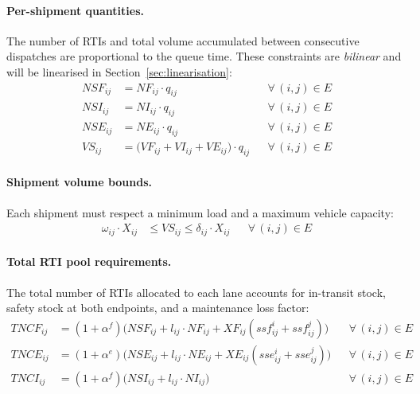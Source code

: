 \paragraph{Per-shipment quantities.}
The number of RTIs and total volume accumulated between consecutive dispatches
are proportional to the queue time. These constraints are \emph{bilinear} and
will be linearised in Section~\ref{sec:linearisation}:
%
\begin{align}
  NSF_{ij} &= NF_{ij}\cdot q_{ij}
    && \forall\,(i,j)\in E
    \label{eq:ship-full}\\
  NSI_{ij} &= NI_{ij}\cdot q_{ij}
    && \forall\,(i,j)\in E
    \label{eq:ship-inlay}\\
  NSE_{ij} &= NE_{ij}\cdot q_{ij}
    && \forall\,(i,j)\in E
    \label{eq:ship-empty}\\
  VS_{ij}  &= \bigl(VF_{ij}+VI_{ij}+VE_{ij}\bigr)\cdot q_{ij}
    && \forall\,(i,j)\in E
    \label{eq:ship-vol}
\end{align}

\paragraph{Shipment volume bounds.}
Each shipment must respect a minimum load and a maximum vehicle capacity:
%
\begin{align}
  \omega_{ij}\cdot X_{ij} &\leq VS_{ij} \leq \delta_{ij}\cdot X_{ij}
    && \forall\,(i,j)\in E
    \label{eq:vol-bounds}
\end{align}

\paragraph{Total RTI pool requirements.}
The total number of RTIs allocated to each lane accounts for in-transit stock,
safety stock at both endpoints, and a maintenance loss factor:
%
\begin{align}
  TNCF_{ij} &= (1+\alpha^{f})\bigl(NSF_{ij} + l_{ij}\cdot NF_{ij}
               + XF_{ij}(ssf^{i}_{ij}+ssf^{j}_{ij})\bigr)
    && \forall\,(i,j)\in E
    \label{eq:pool-full}\\
  TNCE_{ij} &= (1+\alpha^{e})\bigl(NSE_{ij} + l_{ij}\cdot NE_{ij}
               + XE_{ij}(sse^{i}_{ij}+sse^{j}_{ij})\bigr)
    && \forall\,(i,j)\in E
    \label{eq:pool-empty}\\
  TNCI_{ij} &= (1+\alpha^{f})\bigl(NSI_{ij} + l_{ij}\cdot NI_{ij}\bigr)
    && \forall\,(i,j)\in E
    \label{eq:pool-inlay}
\end{align}

